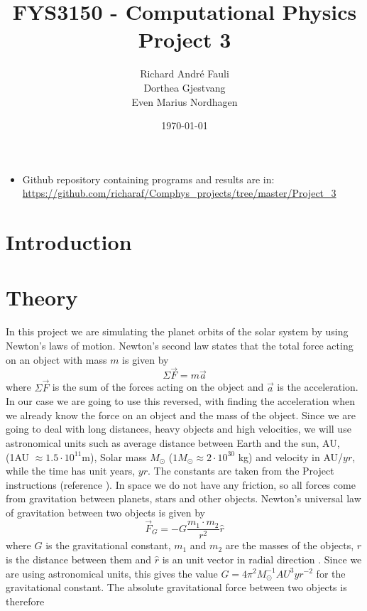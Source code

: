 \documentclass[norsk,a4paper,12pt]{article}
\title{FYS3150 - Computational Physics\\\vspace{2mm} \Large{Project 3}}
\author{\large Richard Andr\'e Fauli\\ Dorthea Gjestvang\\ Even Marius Nordhagen}
\date{\today}
\begin{document}
\maketitle

\begin{abstract}
\end{abstract}
\begin{itemize}
\item Github repository containing programs and results are in: \url{https://github.com/richaraf/Comphys_projects/tree/master/Project_3}
\end{itemize}
\section{Introduction}
\section{Theory}
In this project we are simulating the planet orbits of the solar system by using Newton's laws of motion. Newton's second law states that the total force acting on an object with mass $m$ is given by
\begin{equation}
\Sigma\vec{F}=m\vec{a}
\label{eq:N2L}
\end{equation}
where $\Sigma \vec{F}$ is the sum of the forces acting on the object and $\vec{a}$ is the acceleration. In our case we are going to use this reversed, with finding the acceleration when we already know the force on an object and the mass of the object. Since we are going to deal with long distances, heavy objects and high velocities, we will use astronomical units such as average distance between Earth and the sun, AU, (1AU $\approx1.5\cdot10^{11}$m), Solar mass $M_\odot$ ($1M_{\odot}\approx2\cdot10^{30}$ kg) and velocity in AU/$yr$, while the time has unit years, $yr$. The constants are taken from the Project instructions (reference \cite {Project_text}). In space we do not have any friction, so all forces come from gravitation between planets, stars and other objects. Newton's universal law of gravitation between two objects is given by
\begin{equation}
\vec{F}_G=-G\frac{m_1\cdot m_2}{r^2}\hat{r}
\label{eq:GravitationalForce}
\end{equation}
where $G$ is the gravitational constant, $m_1$ and $m_2$ are the masses of the objects, $r$ is the distance between them and $\hat{r}$ is an unit vector in radial direction \cite{Barycenter}. Since we are using astronomical units, this gives the value $G = 4\pi^2 M_{\odot} ^{-1} AU^3 yr^{-2}$ \cite{Project_text} for the gravitational constant.  The absolute gravitational force between two objects is therefore
\end{document}
